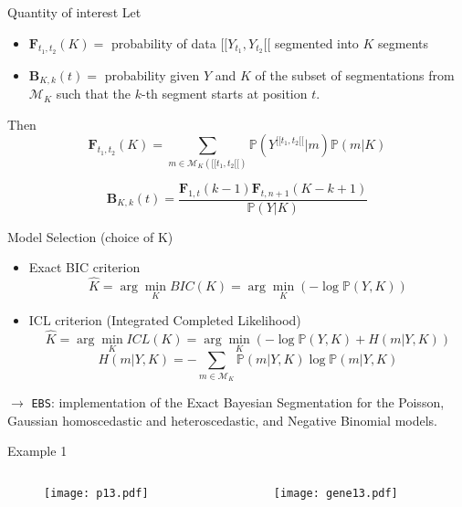 \documentclass[a4paper]{beamer}
\newcommand{\PP}{\mathbb P}
\begin{document}
\begin{frame}{Quantity of interest}
  Let 
  \begin{itemize}
    \item $\mathbf{F}_{t_1,t_2}(K) =$ probability of data $[\![Y_{t_1},Y_{t_2}[\![ $ segmented into $K$ segments 
    \item $\mathbf{B}_{K,k}(t) = $ probability given $Y$ and $K$ of the subset of segmentations from $\mathcal{M}_K$ such that the $k$-th segment starts at position $t$.
  \end{itemize}

\vspace{0.5cm}
  Then
  $$\mathbf{F}_{t_1,t_2}(K) = \sum_{m\in \mathcal{M}_{K}([\![t_1,t_2 [\![)} \PP(Y^{[\![t_1,t_2 [\![}|m)\PP(m|K)$$

\vspace{0.3cm}
  $$\mathbf{B}_{K,k}(t) = \dfrac{\mathbf{F}_{1,t}(k-1)\mathbf{F}_{t,n+1}(K-k+1)}{\PP(Y|K)}$$
\end{frame}

\begin{frame}{Model Selection (choice of K)}
  \begin{itemize}
    \item Exact BIC criterion
      $$\hat{K}=\arg \min_K BIC(K) = \arg \min_K (-\log\PP(Y,K)) $$

    \item ICL criterion (Integrated Completed Likelihood)
      $$\hat{K}=\arg \min_K ICL(K) = \arg \min_K (-\log\PP(Y,K)+H(m|Y,K)) $$
      $$H(m|Y,K) = -\sum_{m\in\mathcal{M}_K} \PP(m|Y,K)\log\PP(m|Y,K)$$
  \end{itemize}
  
  	\vspace{0.5cm}
	$\rightarrow$ \texttt{EBS}: implementation of the Exact Bayesian Segmentation for the Poisson, Gaussian homoscedastic and heteroscedastic, and Negative Binomial models.
\end{frame}

\begin{frame}{Example 1}
  \begin{columns}
    \begin{column}{6cm}
    \begin{figure}
    \centering
    \texttt{[image: p13.pdf]}
  \end{figure}
    \end{column}
    \begin{column}{6cm}
    \begin{figure}
    \centering
    \texttt{[image: gene13.pdf]}
  \end{figure}
     \end{column}
  \end{columns}
\end{frame}
\end{document}
